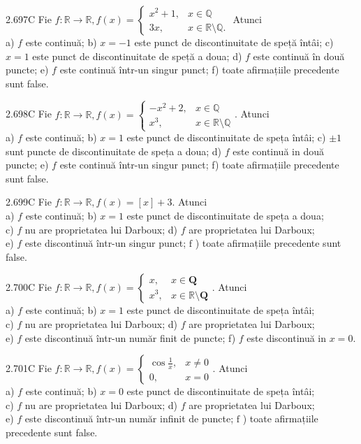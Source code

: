 \documentclass[11pt]{article}
\begin{document}
2.697C Fie $f: \mathbb{R} \rightarrow \mathbb{R}, f(x) = \begin{cases} x^2 + 1, & x \in \mathbb{Q} \\ 3x, & x \in \mathbb{R} \setminus \mathbb{Q}.\end{cases}$ Atunci\\ a) $f$ este continuă; b) $x = -1$ este punct de discontinuitate de speță întâi; c) $x = 1$ este punct de discontinuitate de speță a doua; d) $f$ este continuă în două puncte; e) $f$ este continuă într-un singur punct; f) toate afirmațiile precedente sunt false.

2.698C Fie $f: \mathbb{R} \rightarrow \mathbb{R}, f(x)=\left\{\begin{array}{ll}-x^{2}+2, & x \in \mathbb{Q} \\ x^{3}, & x \in \mathbb{R} \setminus \mathbb{Q}\end{array}\right.$. Atunci\\ a) $f$ este continuă; b) $x=1$ este punct de discontinuitate de speța întâi; c) $\pm 1$ sunt puncte de discontinuitate de speța a doua; d) $f$ este continuă in două puncte; e) $f$ este continuă într-un singur punct; f) toate afirmațiile precedente sunt false.

2.699C Fie $f: \mathbb{R} \rightarrow \mathbb{R}, f(x)=[x]+3$. Atunci\\ a) $f$ este continuă; b) $x=1$ este punct de discontinuitate de speța a doua;\\ c) $f$ nu are proprietatea lui Darboux; d) $f$ are proprietatea lui Darboux;\\ e) $f$ este discontinuă într-un singur punct; $\mathrm{f}$ ) toate afirmațiile precedente sunt false.

2.700C Fie $f: \mathbb{R} \rightarrow \mathbb{R}, f(x)= \begin{cases}x, & x \in \mathbf{Q} \\ x^{3}, & x \in \mathbb{R} \setminus \mathbf{Q}\end{cases}$. Atunci\\ a) $f$ este continuă; b) $x=1$ este punct de discontinuitate de speța întâi;\\ c) $f$ nu are proprietatea lui Darboux; d) $f$ are proprietatea lui Darboux;\\ e) $f$ este discontinuă într-un număr finit de puncte; f) $f$ este discontinuă in $x=0$.

2.701C Fie $f: \mathbb{R} \rightarrow \mathbb{R}, f(x)=\left\{\begin{array}{ll}\cos \frac{1}{x}, & x \neq 0 \\ 0, & x=0\end{array}\right.$. Atunci\\ a) $f$ este continuă; b) $x=0$ este punct de discontinuitate de speța întâi;\\ c) $f$ nu are proprietatea lui Darboux; d) $f$ are proprietatea lui Darboux;\\ e) $f$ este discontinuă într-un număr infinit de puncte; $\mathrm{f}$ ) toate afirmațiile precedente sunt false.
\end{document}
